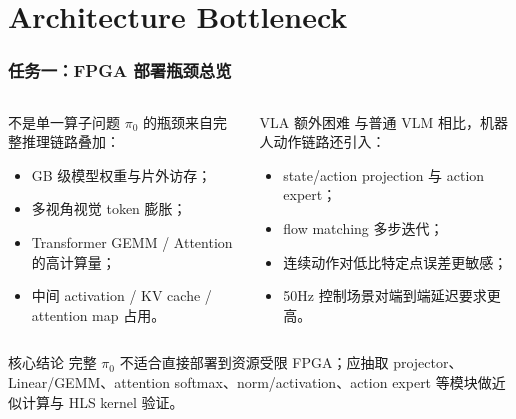 \documentclass[10pt, aspectratio=169]{beamer}
\newcommand{\piZero}{\texorpdfstring{$\pi_0$}{pi0}\xspace}
\begin{document}
\section{Architecture Bottleneck}

\begin{frame}
  \frametitle{任务一：FPGA 部署瓶颈总览}
  \small
  \begin{columns}[T,onlytextwidth]
    \begin{block}{不是单一算子问题}
      \piZero 的瓶颈来自完整推理链路叠加：
      \begin{itemize}
        \item GB 级模型权重与片外访存；
        \item 多视角视觉 token 膨胀；
        \item Transformer GEMM / Attention 的高计算量；
        \item 中间 activation / KV cache / attention map 占用。
      \end{itemize}
    \end{block}

    \begin{block}{VLA 额外困难}
      与普通 VLM 相比，机器人动作链路还引入：
      \begin{itemize}
        \item state/action projection 与 action expert；
        \item flow matching 多步迭代；
        \item 连续动作对低比特定点误差更敏感；
        \item 50Hz 控制场景对端到端延迟要求更高。
      \end{itemize}
    \end{block}
  \end{columns}

  \vspace{4pt}
  \begin{alertblock}{核心结论}
    完整 \piZero 不适合直接部署到资源受限 FPGA；应抽取 projector、Linear/GEMM、attention softmax、norm/activation、action expert 等模块做近似计算与 HLS kernel 验证。
  \end{alertblock}
\end{frame}
\end{document}
